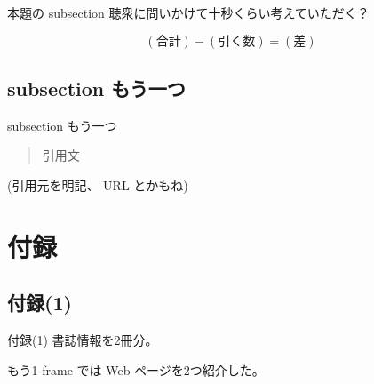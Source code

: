 \begin{frame}{本題の subsection}
  聴衆に問いかけて十秒くらい考えていただく？
  \pause

  \bigskip
  \[
  (\text{合計}) - (\text{引く数}) = (\text{差})
  \]
\end{frame}

\subsection{subsection もう一つ}

\begin{frame}{subsection もう一つ}
  \begin{quote}
    引用文
  \end{quote}
  (引用元を明記、 URL とかもね)
\end{frame}

\section{付録}

\subsection{付録(1)}

\begin{frame}{付録(1)}
  書誌情報を2冊分。

  もう1 frame では Web ページを2つ紹介した。
\end{frame}


